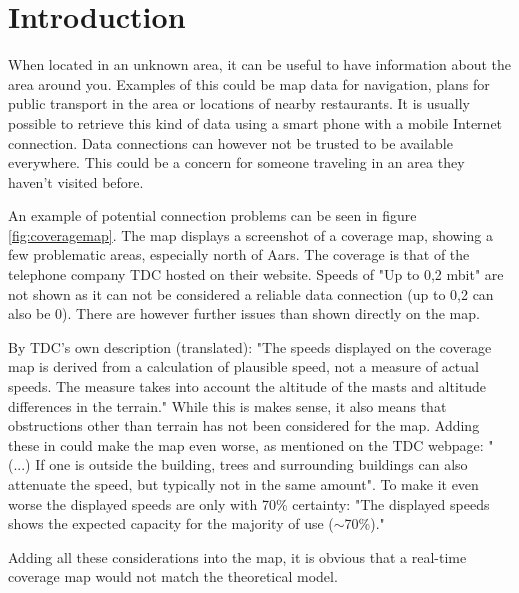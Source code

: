 \chapter{Introduction}
\label{chap:intro}

When located in an unknown area, it can be useful to have information about the area around you. Examples of this could be map data for navigation, plans for public transport in the area or locations of nearby restaurants. It is usually possible to retrieve this kind of data using a smart phone with a mobile Internet connection. Data connections can however not be trusted to be available everywhere. This could be a concern for someone traveling in an area they haven't visited before.

An example of potential connection problems can be seen in figure \ref{fig:coveragemap}.
The map displays a screenshot of a coverage map, showing a few problematic areas, especially north of Aars. The coverage is that of the telephone company TDC hosted on their website\cite{tdccoverage}. Speeds of "Up to 0,2 mbit" are not shown as it can not be considered a reliable data connection (up to 0,2 can also be 0). There are however further issues than shown directly on the map.

By TDC's own description (translated): "The speeds displayed on the coverage map is derived from a calculation of plausible speed, not a measure of actual speeds. The measure takes into account the altitude of the masts and altitude differences in the terrain."
While this is makes sense, it also means that obstructions other than terrain has not been considered for the map. Adding these in could make the map even worse, as mentioned on the TDC webpage: "(...) If one is outside the building, trees and surrounding buildings can also attenuate the speed, but typically not in the same amount".
To make it even worse the displayed speeds are only with 70\% certainty: "The displayed speeds shows the expected capacity for the majority of use ($\sim$70\%)."

Adding all these considerations into the map, it is obvious that a real-time coverage map would not match the theoretical model. 

